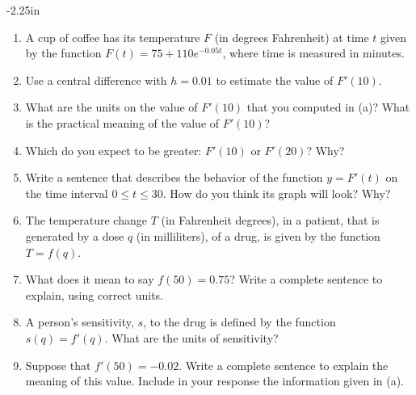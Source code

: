 \begin{adjustwidth*}{}{-2.25in}
\begin{multicols*}{2}
\begin{enumerate}[1),resume]
\item A cup of coffee has its temperature $F$ (in degrees Fahrenheit) at time $t$ given by the function $F(t) = 75 + 110 e^{-0.05t}$, where time is measured in minutes.
\ba
\item Use a central difference with $h = 0.01$ to estimate the value of $F'(10)$.
\item What are the units on the value of $F'(10)$ that you computed in (a)?  What is the practical meaning of the value of $F'(10)$?
\item Which do you expect to be greater: $F'(10)$ or $F'(20)$?  Why?  
\item Write a sentence that describes the behavior of the function $y = F'(t)$ on the time interval $0 \le t \le 30$.  How do you think its graph will look?  Why?
\ea

\item The temperature change $T$ (in Fahrenheit degrees), in a patient, that is generated by a dose $q$ (in milliliters), of a drug, is given by the function $T = f(q)$.
\ba
\item What does it mean to say $f(50) = 0.75$?  Write a complete sentence to explain, using correct units.
\item A person's sensitivity, $s$, to the drug is defined by the function $s(q) = f'(q)$.  What are the units of sensitivity?
\item Suppose that $f'(50) = -0.02$.  Write a complete sentence to explain the meaning of this value.  Include in your response the information given in (a).
\ea

\end{enumerate}

\end{multicols*}
\end{adjustwidth*}

\clearpage


